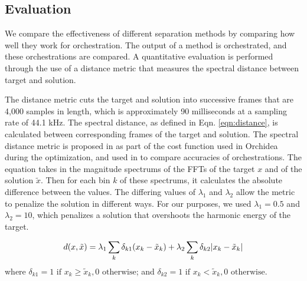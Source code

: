 \documentclass{article}
\begin{document}
    \subsection{Evaluation}
    We compare the effectiveness of different separation methods by comparing how well they work for orchestration. The output of a method is orchestrated, and these orchestrations are compared. A quantitative evaluation is performed through the use of a distance metric that measures the spectral distance between target and solution. 
    
    The distance metric cuts the target and solution into successive frames that are 4,000 samples in length, which is approximately 90 milliseconds at a sampling rate of 44.1 kHz. The spectral distance, as defined in Eqn. \ref{eqn:distance}, is calculated between corresponding frames of the target and solution. The spectral distance metric is proposed in \cite{Cella2020} as part of the cost function used in Orchidea during the optimization, and used in \cite{Cella2020b} to compare accuracies of orchestrations. The equation takes in the magnitude spectrums of the FFTs of the target $x$ and of the solution $\tilde{x}$. Then for each bin $k$ of these spectrums, it calculates the absolute difference between the values. The differing values of $\lambda_1$ and $\lambda_2$ allow the metric to penalize the solution in different ways. For our purposes, we used $\lambda_1 = 0.5$ and $\lambda_2 = 10$, which penalizes a solution that overshoots the harmonic energy of the target.
    
    \begin{equation}\label{eqn:distance}
d(x, \tilde{x}) =\lambda_1 \sum_k \delta_{k1}(x_k - \tilde{x}_k) + \lambda_2 \sum_k \delta_{k2}|x_k - \tilde{x  }_k| \\
\end{equation}
where $\delta_{k1} = 1 \text{  if  } x_k \ge \tilde{x}_k, 0 \text{  otherwise}$; and $\delta_{k2} = 1 \text{  if  } x_k < \tilde{x}_k, 0 \text{  otherwise}$.
  
\end{document}
